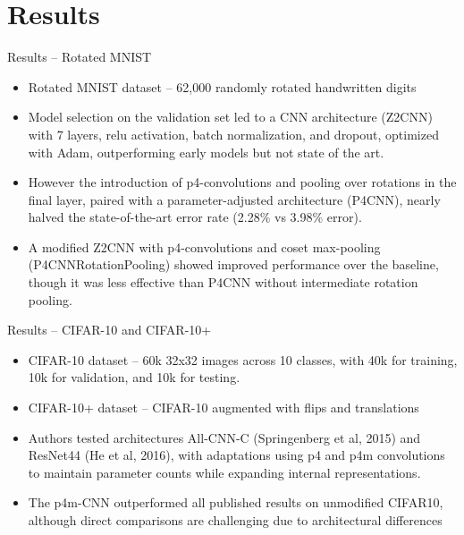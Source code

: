 \documentclass{beamer}
\begin{document}
\section{Results}

\begin{frame}{Results -- Rotated MNIST}
    \begin{itemize}
        \item Rotated MNIST dataset -- 62,000 randomly rotated handwritten digits
        \item Model selection on the validation set led to a CNN architecture (Z2CNN) with 7 layers, relu activation, batch normalization, and dropout, optimized with Adam, outperforming early models but not state of the art.
        \item However the introduction of p4-convolutions and pooling over rotations in the final layer, paired with a parameter-adjusted architecture (P4CNN), nearly halved the state-of-the-art error rate (2.28\% vs 3.98\% error).
        \item A modified Z2CNN with p4-convolutions and coset max-pooling (P4CNNRotationPooling) showed improved performance over the baseline, though it was less effective than P4CNN without intermediate rotation pooling.
      \end{itemize}
\end{frame}

\begin{frame}{Results -- CIFAR-10 and CIFAR-10+}
    \begin{itemize}
        \item CIFAR-10 dataset -- 60k 32x32 images across 10 classes, with 40k for training, 10k for validation, and 10k for testing.
        \item CIFAR-10+ dataset -- CIFAR-10 augmented with flips and translations
        \item Authors tested architectures  All-CNN-C  (Springenberg et al, 2015) and ResNet44 (He et al, 2016), with adaptations using p4 and p4m convolutions to maintain parameter counts while expanding internal representations.
        \item The p4m-CNN outperformed all published results on unmodified CIFAR10, although direct comparisons are challenging due to architectural differences 
      \end{itemize}
\end{frame} 
\end{document}
